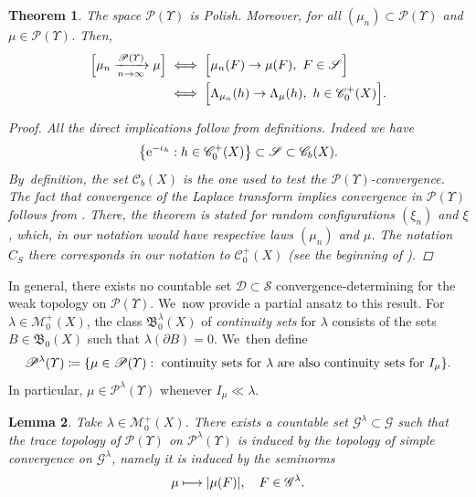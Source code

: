 \documentclass[JEP,XML,SOM,Unicode,published]{cedram}
\newcommand\mto{\mathchoice{\longmapsto}{\mapsto}{\mapsto}{\mapsto}}
\newtheorem{theorem}{Theorem}[section]
\newtheorem{lemma}[theorem]{Lemma}
\theoremstyle{definition}
\theoremstyle{remark}
\DeclarePairedDelimiter{\bracket}{\lbrack}{\rbrack}
\DeclarePairedDelimiter{\set}{\lbrace}{\rbrace}
\DeclarePairedDelimiter{\abs}{\lvert}{\rvert}
\begin{document}
\begin{theorem}\label{t:weak-convergence-P-upsilon}
The space $\mathscr{P}(\varUpsilon)$ is Polish.
Moreover, for all $(\mu_{n}) \subset \mathscr{P}(\varUpsilon)$ and $\mu \in \mathscr{P}(\varUpsilon)$.
Then,
\begin{equation}\label{eq:t:weak-convergence-P-upsilon:0}
\begin{aligned}
\bracket[\Big]{ \mu_{n} \xrightarrow[n \to \infty]{\mathscr{P}(\varUpsilon)} \mu } &\iff \bracket[\Big]{ \mu_{n}(F) \to \mu(F),\ F \in \mathscr{S} }\\
&\iff \bracket[\Big]{ \Lambda_{\mu_{n}}(h) \to \Lambda_{\mu}(h),\ h \in \mathscr{C}_{0}^{+}(X) }.
\end{aligned}
\end{equation}

\begin{proof}
All the direct implications follow from definitions.
Indeed we have
\begin{equation*}
\set*{ \mathrm{e}^{-\iota_{h}} : h \in \mathscr{C}_{0}^{+}(X) } \subset \mathscr{S} \subset \mathscr{C}_{b}(X).
\end{equation*}
By~definition, the set $\mathscr{C}_{b}(X)$ is the one used to test the $\mathscr{P}(\varUpsilon)$-convergence.
The fact that convergence of the Laplace transform implies convergence in $\mathscr{P}(\varUpsilon)$ follows from \cite[Th.\,4.11]{Kallenberg}.
There, the theorem is stated for random configurations $(\xi_{n})$ and $\xi$, which, in our notation would have respective laws $(\mu_{n})$ and $\mu$.
The notation $\hat{C}_{S}$ there corresponds in our notation to $\mathscr{C}_{0}^{+}(X)$ (see the beginning of \cite[Ch.\,4]{Kallenberg}).
\end{proof}
\end{theorem}
In general, there exists no countable set $\mathscr{D} \subset \mathscr{S}$ convergence-determining for the weak topology on $\mathscr{P}(\varUpsilon)$. We~now provide a partial ansatz to this result.
For $\lambda \in \mathscr{M}_{0}^{+}(X)$, the class $\mathfrak{B}_{0}^{\lambda}(X)$ of \emph{continuity sets} for $\lambda$ consists of the sets $B \in \mathfrak{B}_{0}(X)$ such that $\lambda(\partial B) = 0$. We~then define
\begin{equation}\label{e:control-continuity-sets}
\mathscr{P}^{\lambda}(\varUpsilon) \coloneq \set*{ \mu \in \mathscr{P}(\varUpsilon) : \text{ continuity sets for $\lambda$ are also continuity sets for $I_{\mu}$} }.
\end{equation}
In particular, $\mu \in \mathscr{P}^{\lambda}(\varUpsilon)$ whenever $I_{\mu} \ll \lambda$.
\begin{lemma}\label{t:weak-convergence-countable}
Take $\lambda \in \mathscr{M}^{+}_{0}(X)$.
There exists a countable set $\mathscr{G}^{\lambda} \subset \mathscr{G}$ such that the trace topology of $\mathscr{P}(\varUpsilon)$ on $\mathscr{P}^{\lambda}(\varUpsilon)$ is induced by the topology of simple convergence on $\mathscr{G}^{\lambda}$, namely it is induced by the seminorms
\begin{equation}\label{e:weak-convergence-countable-seminorms}
\mu \mto \abs{\mu(F)}, \quad F \in \mathscr{G}^{\lambda}.
\end{equation}
\end{lemma}
\end{document}
